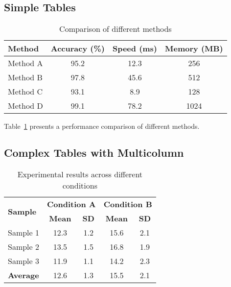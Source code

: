 \subsection{Simple Tables}
\label{subsec:simple_tables}

\begin{table}[htbp]
	\centering
	\caption{Comparison of different methods}
	\label{tab:comparison}
	\begin{tabular}{lccc}
		\toprule
		\textbf{Method} & \textbf{Accuracy (\%)} & \textbf{Speed (ms)} & \textbf{Memory (MB)} \\
		\midrule
		Method A        & 95.2                   & 12.3                & 256                  \\
		Method B        & 97.8                   & 45.6                & 512                  \\
		Method C        & 93.1                   & 8.9                 & 128                  \\
		Method D        & 99.1                   & 78.2                & 1024                 \\
		\bottomrule
	\end{tabular}
\end{table}

Table~\ref{tab:comparison} presents a performance comparison of different methods.

\subsection{Complex Tables with Multicolumn}
\label{subsec:complex_tables}

\begin{table}[htbp]
	\centering
	\caption{Experimental results across different conditions}
	\label{tab:experimental}
	\begin{tabular}{l|cc|cc}
		\toprule
		\multirow{2}{*}{\textbf{Sample}}          &
		\multicolumn{2}{c|}{\textbf{Condition A}} &
		\multicolumn{2}{c}{\textbf{Condition B}}                                                              \\
		                                          & \textbf{Mean} & \textbf{SD} & \textbf{Mean} & \textbf{SD} \\
		\midrule
		Sample 1                                  & 12.3          & 1.2         & 15.6          & 2.1         \\
		Sample 2                                  & 13.5          & 1.5         & 16.8          & 1.9         \\
		Sample 3                                  & 11.9          & 1.1         & 14.2          & 2.3         \\
		\midrule
		\textbf{Average}                          & 12.6          & 1.3         & 15.5          & 2.1         \\
		\bottomrule
	\end{tabular}
\end{table}

